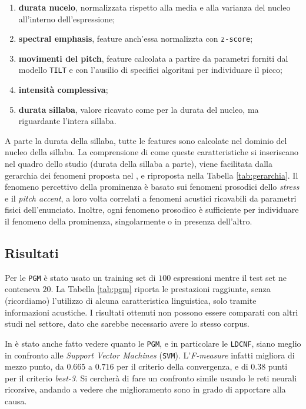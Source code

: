 \documentclass[twoside,twocolumn,10pt]{extarticle}
\theoremstyle{definition}
\begin{document}
		\begin{enumerate}
			\item \textbf{durata nucelo}, normalizzata rispetto alla media e alla varianza del nucleo all'interno dell'espressione;
			\item \textbf{spectral emphasis}, feature anch'essa normalizzta con \texttt{z-score};
			\item \textbf{movimenti del pitch}, feature calcolata a partire da parametri forniti dal modello \texttt{TILT} e con l'ausilio di specifici algoritmi per individuare il picco;
			\item \textbf{intensità complessiva};
			\item \textbf{durata sillaba}, valore ricavato come per la durata del nucleo, ma riguardante l'intera sillaba.
		\end{enumerate}
		
		A parte la durata della sillaba, tutte le features sono calcolate nel dominio del nucleo della sillaba. La comprensione di come queste caratteristiche si inseriscano nel quadro dello studio (durata della sillaba a parte), viene facilitata dalla gerarchia dei fenomeni proposta nel \cite[Capitolo 3]{bib:fenomeni-prosodici-prominenza}, e riproposta nella Tabella \ref{tab:gerarchia}. Il fenomeno percettivo della prominenza è basato sui fenomeni prosodici dello \textit{stress}	e il \textit{pitch accent}, a loro volta correlati a fenomeni acustici ricavabili da parametri fisici dell'enunciato. Inoltre, ogni fenomeno prosodico è sufficiente per individuare il fenomeno della prominenza, singolarmente o in presenza dell'altro.
		
	\subsection{Risultati}
		
		Per le \texttt{PGM} è stato usato un training set di $100$ espressioni mentre il test set ne conteneva $20$. La Tabella \ref{tab:pgm} riporta le prestazioni raggiunte, senza (ricordiamo) l'utilizzo di alcuna caratteristica linguistica, solo tramite informazioni acustiche. I risultati ottenuti non possono essere comparati con altri studi nel settore, dato che sarebbe necessario avere lo stesso corpus.
		
		In \cite{bib:prominence-detection-italian} è stato anche fatto vedere quanto le \texttt{PGM}, e in particolare le \texttt{LDCNF}, siano meglio in confronto alle \textit{Support Vector Machines} (\texttt{SVM}). L'\textit{F-measure} infatti migliora di mezzo punto, da $0.665$ a $0.716$ per il criterio della convergenza, e di $0.38$ punti per il criterio \textit{best-3}. Si cercherà di fare un confronto simile usando le reti neurali ricorsive, andando a vedere che miglioramento sono in grado di apportare alla causa.
	
\end{document}
